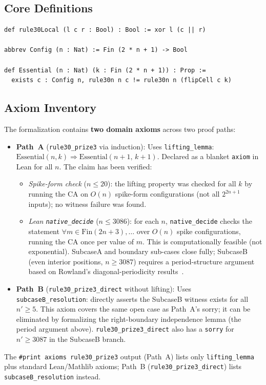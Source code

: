 \documentclass[11pt]{article}
\theoremstyle{plain}
\theoremstyle{definition}
\newcommand{\Essential}{\mathrm{Essential}}
\begin{document}
\subsection{Core Definitions}

\begin{lstlisting}
def rule30Local (l c r : Bool) : Bool := xor l (c || r)

abbrev Config (n : Nat) := Fin (2 * n + 1) -> Bool

def Essential (n : Nat) (k : Fin (2 * n + 1)) : Prop :=
  exists c : Config n, rule30n n c != rule30n n (flipCell c k)
\end{lstlisting}

\subsection{Axiom Inventory}
\label{sec:axioms}

The formalization contains \textbf{two domain axioms} across two proof paths:

\begin{itemize}
  \item \textbf{Path~A} (\texttt{rule30\_prize3} via induction):
    Uses \texttt{lifting\_lemma}: $\Essential(n,k) \Rightarrow \Essential(n{+}1,\,k{+}1)$.
    Declared as a blanket \texttt{axiom} in Lean for all $n$.
    The claim has been verified:
    \begin{itemize}
      \item \emph{Spike-form check} ($n \leq 20$): the lifting property was checked for all $k$
        by running the CA on $O(n)$ spike-form configurations (not all $2^{2n+1}$ inputs);
        no witness failure was found.
      \item \emph{Lean \texttt{native\_decide}} ($n \leq 3086$): for each $n$, \texttt{native\_decide}
        checks the statement $\forall m \in \mathrm{Fin}(2n{+}3),\ldots$ over $O(n)$ spike
        configurations, running the CA once per value of $m$.  This is computationally
        feasible (not exponential).  SubcaseA and boundary sub-cases close fully;
        SubcaseB (even interior positions, $n \geq 3087$) requires a period-structure
        argument based on Rowland's diagonal-periodicity results~\cite{Rowland2006}.
    \end{itemize}

  \item \textbf{Path~B} (\texttt{rule30\_prize3\_direct} without lifting):
    Uses \texttt{subcaseB\_resolution}: directly asserts the SubcaseB witness exists
    for all $n' \geq 5$.  This axiom covers the same open case as Path~A's sorry;
    it can be eliminated by formalizing the right-boundary independence lemma
    (the period argument above).  \texttt{rule30\_prize3\_direct} also has a
    \texttt{sorry} for $n' \geq 3087$ in the SubcaseB branch.

\end{itemize}
The \texttt{\#print axioms rule30\_prize3} output (Path~A) lists only
\texttt{lifting\_lemma} plus standard Lean/Mathlib axioms;
Path~B (\texttt{rule30\_prize3\_direct}) lists \texttt{subcaseB\_resolution} instead.
\end{document}
